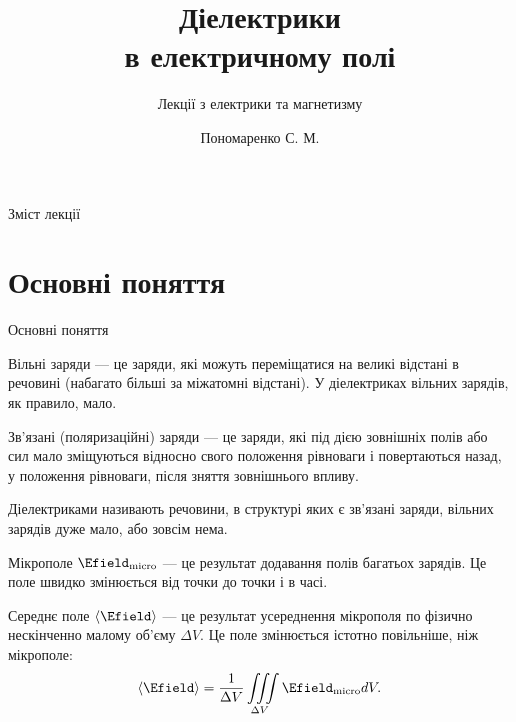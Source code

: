 \documentclass[]{beamer}
\title[Лекції електрики та магнетизму]{\huge\bfseries Діелектрики \\ в електричному полі}
\subtitle{Лекції з електрики та магнетизму}
\author{Пономаренко С. М.}
\date{}
\begin{document}
\begin{frame}[plain]
	\maketitle
\end{frame}

\begin{frame}{Зміст лекції}{}
	\tableofcontents
\end{frame}

\section{Основні поняття}



\begin{frame}{Основні поняття}{}\small

	\begin{block}{}\justifying
		\alert{Вільні заряди} --- це заряди, які можуть переміщатися на великі відстані в речовині
		(набагато більші за міжатомні відстані). У діелектриках вільних зарядів, як правило, мало.

		\smallskip

		\alert{Зв'язані (поляризаційні) заряди} --- це заряди, які під дією зовнішніх полів або сил мало
		зміщуються відносно свого положення рівноваги і повертаються назад, у положення рівноваги, після
		зняття
		зовнішнього впливу.

		\smallskip

		\alert{Діелектриками} називають речовини, в структурі яких є зв'язані заряди, вільних зарядів дуже
		мало, або зовсім нема.

	\end{block}

	\begin{block}{}\justifying\scriptsize
		\alert{Мікрополе} $\Efield_\text{micro}$ --- це результат додавання полів багатьох
		зарядів. Це поле
		швидко змінюється від точки до точки і в часі.

		\smallskip

		\alert{Середнє поле} $\left\langle \Efield\right\rangle$  --- це результат усереднення
		мікрополя по
		фізично нескінченно малому об'єму $\Delta V$. Це поле змінюється істотно повільніше, ніж
		мікрополе:
		\begin{equation*}
			\left\langle \Efield\right\rangle = \frac1{\Delta V} \iiint\limits_{\Delta V}
			\Efield_\text{micro} dV.
		\end{equation*}
	\end{block}
\end{frame}
\end{document}
